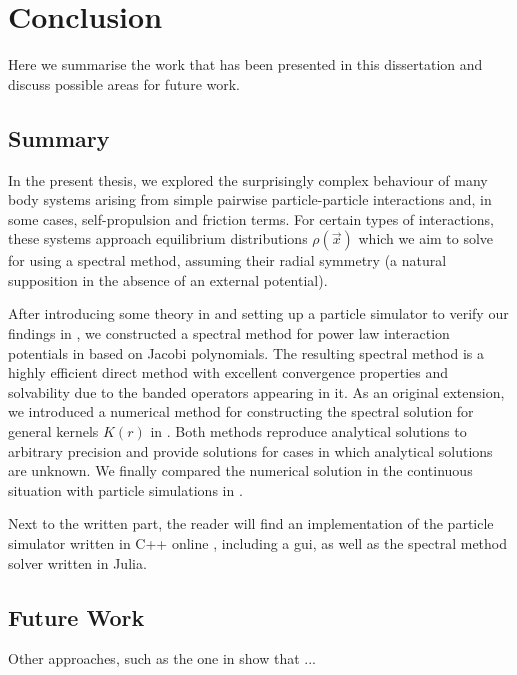 \chapter{Conclusion}
\label{chap:conclusion}

Here we summarise the work that has been presented in this dissertation and discuss possible areas for future work.

\section{Summary}

In the present thesis, we explored the surprisingly complex behaviour of many body systems arising from simple pairwise particle-particle interactions and, in some cases, self-propulsion and friction terms.
For certain types of interactions, these systems approach equilibrium distributions $\rho(\vec{x})$ which we aim to solve for using a spectral method, assuming their radial symmetry (a natural supposition in the absence of an external potential).

After introducing some theory in  and setting up a particle simulator to verify our findings in , we constructed a spectral method for power law interaction potentials in  based on Jacobi polynomials.
The resulting spectral method is a highly efficient direct method with excellent convergence properties and solvability due to the banded operators appearing in it.
As an original extension, we introduced a numerical method for constructing the spectral solution for general kernels $K(r)$ in .
Both methods reproduce analytical solutions to arbitrary precision and provide solutions for cases in which analytical solutions are unknown.
We finally compared the numerical solution in the continuous situation with particle simulations in .

Next to the written part, the reader will find an implementation of the particle simulator written in C++ online \parencite{2023-my-dissertation}, including a \gls{gui}, as well as the spectral method solver written in Julia.

\section{Future Work}
Other approaches, such as the one in \cite{2015-spectral-method-for-boltzmann-equation} show that ...
\hierKoennteIhreWerbungStehen


